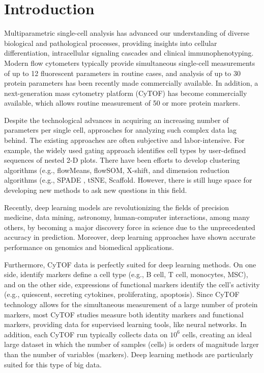 \documentclass[conference]{IEEEtran}
\begin{document}
\section{Introduction}


Multiparametric single-cell analysis has advanced our understanding of
diverse biological and pathological processes, providing insights into
cellular differentiation, intracellular signaling cascades and
clinical immunophenotyping. Modern flow cytometers typically provide
simultaneous single-cell measurements of up to 12 fluorescent
parameters in routine cases, and analysis of up to 30 protein
parameters has been recently made commercially available. In addition,
a next-generation mass cytometry platform (CyTOF) has become
commercially available, which allows routine measurement of 50 or more
protein markers.

Despite the technological advances in acquiring an increasing number
of parameters per single cell, approaches for analyzing such complex
data lag behind. The existing approaches are often subjective and
labor-intensive. For example, the widely used gating approach
identifies cell types by user-defined sequences of nested 2-D
plots. There have been efforts to develop clustering algorithms (e.g.,
flowMeans\cite{Aghaeepour2010}, flowSOM\cite{VanGassen2015},
X-shift\cite{Samusik2016}, and dimension reduction algorithms
(e.g., SPADE \cite{Qiu2011}, tSNE\cite{vanderMaaten2008},
Scaffold\cite{Spitzer2015}. However, there is still huge space
for developing new methods to ask new questions in this field.

Recently, deep learning models are revolutionizing the fields of
precision medicine, data mining, astronomy, human-computer
interactions, among many others, by becoming a major discovery force
in science due to the unprecedented accuracy in prediction.  Moreover,
deep learning approaches have shown accurate performance on genomics
and biomedical
applications\cite{Ciresan2013,Denas2013,Fakoor2013,Leung2014,CruzRoa2014,Li2017,Mobadersany2018}.

Furthermore, CyTOF data is perfectly suited for deep learning methods.
On one side, identify markers define a cell type (e.g., B cell, T
cell, monocytes, MSC), and on the other side, expressions of
functional markers identify the cell's activity (e.g., quiescent,
secreting cytokines, proliferating, apoptosis). Since CyTOF technology
allows for the simultaneous measurement of a large number of protein
markers, most CyTOF studies measure both identity markers and
functional markers, providing data for supervised learning tools, like
neural networks.  In addition, each CyTOF run typically collects data
on $10^6$ cells, creating an ideal large dataset in which the number
of samples (cells) is orders of magnitude larger than the number of
variables (markers). Deep learning methods are particularly suited for
this type of big data.
\end{document}
